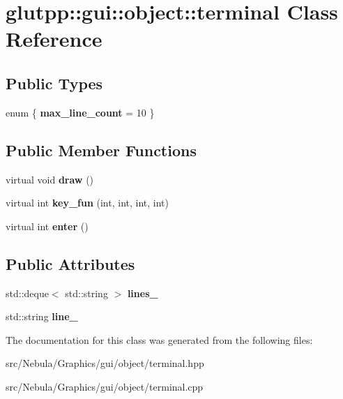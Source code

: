 \hypertarget{classglutpp_1_1gui_1_1object_1_1terminal}{\section{glutpp\-:\-:gui\-:\-:object\-:\-:terminal \-Class \-Reference}
\label{classglutpp_1_1gui_1_1object_1_1terminal}
}
\subsection*{\-Public \-Types}
\begin{DoxyCompactItemize}
\item 
enum \{ {\bfseries max\-\_\-line\-\_\-count} =  10
 \}
\end{DoxyCompactItemize}
\subsection*{\-Public \-Member \-Functions}
\begin{DoxyCompactItemize}
\item 
\hypertarget{classglutpp_1_1gui_1_1object_1_1terminal_aa6568349b7e7409360cded62433f6f58}{virtual void {\bfseries draw} ()}\label{classglutpp_1_1gui_1_1object_1_1terminal_aa6568349b7e7409360cded62433f6f58}

\item 
\hypertarget{classglutpp_1_1gui_1_1object_1_1terminal_a3d6f50eaddf7fda7ed5fb4027d1a9a5c}{virtual int {\bfseries key\-\_\-fun} (int, int, int, int)}\label{classglutpp_1_1gui_1_1object_1_1terminal_a3d6f50eaddf7fda7ed5fb4027d1a9a5c}

\item 
\hypertarget{classglutpp_1_1gui_1_1object_1_1terminal_a419430113f8d9a74d1300dc290a6d709}{virtual int {\bfseries enter} ()}\label{classglutpp_1_1gui_1_1object_1_1terminal_a419430113f8d9a74d1300dc290a6d709}

\end{DoxyCompactItemize}
\subsection*{\-Public \-Attributes}
\begin{DoxyCompactItemize}
\item 
\hypertarget{classglutpp_1_1gui_1_1object_1_1terminal_a7c39f20eb933d89385cd68cbc3fd540c}{std\-::deque$<$ std\-::string $>$ {\bfseries lines\-\_\-}}\label{classglutpp_1_1gui_1_1object_1_1terminal_a7c39f20eb933d89385cd68cbc3fd540c}

\item 
\hypertarget{classglutpp_1_1gui_1_1object_1_1terminal_ac00729aaa825f50b546ce77626c4d650}{std\-::string {\bfseries line\-\_\-}}\label{classglutpp_1_1gui_1_1object_1_1terminal_ac00729aaa825f50b546ce77626c4d650}

\end{DoxyCompactItemize}


\-The documentation for this class was generated from the following files\-:\begin{DoxyCompactItemize}
\item 
src/\-Nebula/\-Graphics/gui/object/terminal.\-hpp\item 
src/\-Nebula/\-Graphics/gui/object/terminal.\-cpp\end{DoxyCompactItemize}
